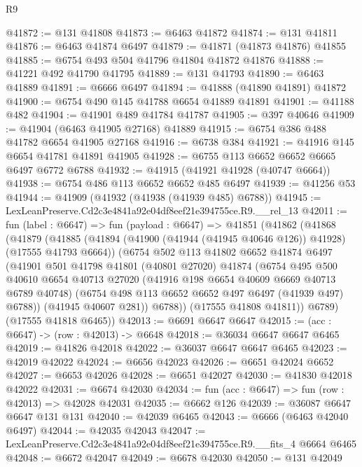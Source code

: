 \begin{lexlean}{R9}
\begin{coremodule}
@41872 := @131 @41808
@41873 := @6463 @41872
@41874 := @131 @41811
@41876 := @6463 @41874 @6497
@41879 := @41871 (@41873 @41876) @41855
@41885 := @6754 @493 @504 @41796 @41804 @41872 @41876
@41888 := @41221 @492 @41790 @41795
@41889 := @131 @41793
@41890 := @6463 @41889
@41891 := @6666 @6497
@41894 := @41888 (@41890 @41891) @41872
@41900 := @6754 @490 @145 @41788 @6654 @41889 @41891
@41901 := @41188 @482
@41904 := @41901 @489 @41784 @41787
@41905 := @397 @40646
@41909 := @41904 (@6463 @41905 @27168) @41889
@41915 := @6754 @386 @488 @41782 @6654 @41905 @27168
@41916 := @6738 @384
@41921 := @41916 @145 @6654 @41781 @41891 @41905
@41928 := @6755 @113 @6652 @6652 @6665 @6497 @6772 @6788
@41932 := @41915 (@41921 @41928 (@40747 @6664))
@41938 := @6754 @486 @113 @6652 @6652 @485 @6497
@41939 := @41256 @53
@41944 := @41909 (@41932 (@41938 (@41939 @485) @6788))
@41945 := LexLeanPreserve.Cd2c3e4841a92e04df8eef21e394755ce.R9.__rel_13
@42011 := fun (label : @6647) =>
  fun (payload : @6647) =>
  @41851
    (@41862
      (@41868
        (@41879
          (@41885
            (@41894 (@41900 (@41944 (@41945 @40646 @126)) @41928) (@17555 @41793 @6664))
            (@6754
              @502
              @113
              @41802
              @6652
              @41874
              @6497
              (@41901
                @501
                @41798
                @41801
                (@40801 @27020)
                @41874
                (@6754
                  @495
                  @500
                  @40610
                  @6654
                  @40713
                  @27020
                  (@41916 @198 @6654 @40609 @6669 @40713 @6789 @40748)
                  (@6754 @498 @113 @6652 @6652 @497 @6497 (@41939 @497) @6788))
                (@41945 @40607 @281))
              @6788))
          (@17555 @41808 @41811))
        @6789)
      (@17555 @41818 @6465))
@42013 := @6691 @6647 @6647
@42015 := (acc : @6647) -> (row : @42013) -> @6648
@42018 := @36034 @6647 @6647 @6465
@42019 := @41826 @42018
@42022 := @36037 @6647 @6647 @6465
@42023 := @42019 @42022
@42024 := @6656 @42023
@42026 := @6651 @42024 @6652
@42027 := @6653 @42026
@42028 := @6651 @42027
@42030 := @41830 @42018 @42022
@42031 := @6674 @42030
@42034 := fun (acc : @6647) => fun (row : @42013) => @42028 @42031
@42035 := @6662 @126
@42039 := @36087 @6647 @6647 @131 @131
@42040 := @42039 @6465
@42043 := @6666 (@6463 @42040 @6497)
@42044 := @42035 @42043
@42047 := LexLeanPreserve.Cd2c3e4841a92e04df8eef21e394755ce.R9.__fits_4 @6664 @6465
@42048 := @6672 @42047
@42049 := @6678 @42030
@42050 := @131 @42049

\end{coremodule}
\end{lexlean}

